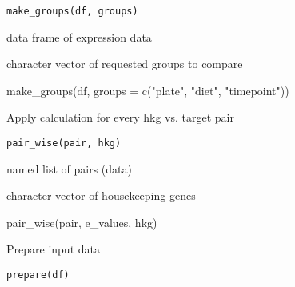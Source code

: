 \documentclass[letterpaper]{book}
\begin{document}
%
\begin{Usage}
\begin{verbatim}
make_groups(df, groups)
\end{verbatim}
\end{Usage}
%
\begin{Arguments}
\begin{ldescription}
\item[\code{df}] data frame of expression data

\item[\code{groups}] character vector of requested groups to compare
\end{ldescription}
\end{Arguments}
%
\begin{Examples}
\begin{ExampleCode}
make_groups(df, groups = c("plate", "diet", "timepoint"))
\end{ExampleCode}
\end{Examples}
%
\begin{Description}\relax
Apply calculation for every hkg vs. target pair
\end{Description}
%
\begin{Usage}
\begin{verbatim}
pair_wise(pair, hkg)
\end{verbatim}
\end{Usage}
%
\begin{Arguments}
\begin{ldescription}
\item[\code{pair}] named list of pairs (data)

\item[\code{hkg}] character vector of housekeeping genes
\end{ldescription}
\end{Arguments}
%
\begin{Examples}
\begin{ExampleCode}
pair_wise(pair, e_values, hkg)
\end{ExampleCode}
\end{Examples}
%
\begin{Description}\relax
Prepare input data
\end{Description}
%
\begin{Usage}
\begin{verbatim}
prepare(df)
\end{verbatim}
\end{Usage}
\end{document}
